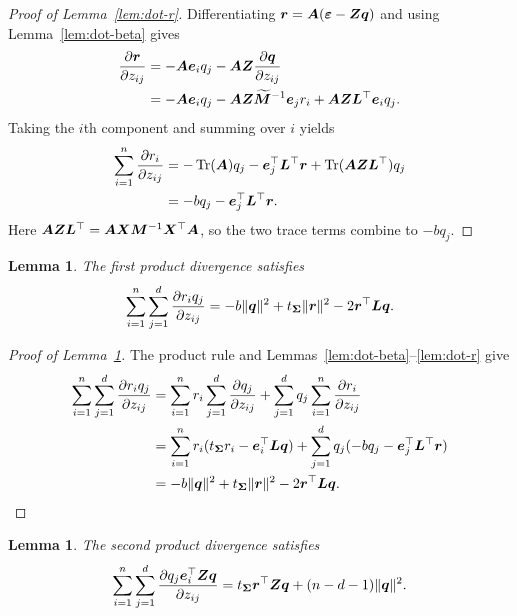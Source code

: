 \documentclass{article}
\theoremstyle{plain} %
\newtheorem{lemma}[theorem]{Lemma}
\theoremstyle{definition} %
\theoremstyle{definition} %
\begin{document}
\begin{proof}[Proof of Lemma~\ref{lem:dot-r}]
Differentiating $\boldsymbol{r}=\boldsymbol{A}({\boldsymbol{\varepsilon} }-\boldsymbol{Z}\boldsymbol{q})$ and using
Lemma~\ref{lem:dot-beta} gives
\begin{align*}
    \pdv{\boldsymbol{r}}{z_{ij}}
    &=-\boldsymbol{A}\boldsymbol{e}_iq_j-\boldsymbol{A}\boldsymbol{Z}\pdv{\boldsymbol{q}}{z_{ij}}\\
    &=-\boldsymbol{A}\boldsymbol{e}_iq_j
       -\boldsymbol{A}\boldsymbol{Z}\widetilde{\boldsymbol{M}}^{-1}\boldsymbol{e}_jr_i
       +\boldsymbol{A}\boldsymbol{Z}\boldsymbol{L}^\top\boldsymbol{e}_iq_j.
\end{align*}
Taking the $i$th component and summing over $i$ yields
\begin{align*}
    \sum_{i=1}^n\pdv{r_i}{z_{ij}}
    &=-\operatorname{Tr}(\boldsymbol{A})q_j-\boldsymbol{e}_j^\top\boldsymbol{L}^\top\boldsymbol{r}
       +\operatorname{Tr}(\boldsymbol{A}\boldsymbol{Z}\boldsymbol{L}^\top)q_j\\
    &=-bq_j-\boldsymbol{e}_j^\top\boldsymbol{L}^\top\boldsymbol{r}.
\end{align*}
Here
$\boldsymbol{A}\boldsymbol{Z}\boldsymbol{L}^\top=\boldsymbol{A}\boldsymbol{X}\boldsymbol{M}^{-1}\boldsymbol{X}^\top\boldsymbol{A}$,
so the two trace terms combine to $-bq_j$.
\end{proof}

\begin{lemma}\label{lem:dot-rh}
The first product divergence satisfies
\begin{align*}
    \sum_{i=1}^n\sum_{j=1}^d\pdv{r_iq_j}{z_{ij}}
    =-b\lVert\boldsymbol{q}\rVert^2+t_{\boldsymbol{\Sigma}}\lVert\boldsymbol{r}\rVert^2
      -2\boldsymbol{r}^\top\boldsymbol{L}\boldsymbol{q}.
\end{align*}
\end{lemma}

\begin{proof}[Proof of Lemma~\ref{lem:dot-rh}]
The product rule and Lemmas~\ref{lem:dot-beta}--\ref{lem:dot-r} give
\begin{align*}
    \sum_{i=1}^n\sum_{j=1}^d\pdv{r_iq_j}{z_{ij}}
    &=\sum_{i=1}^n r_i\sum_{j=1}^d\pdv{q_j}{z_{ij}}
       +\sum_{j=1}^d q_j\sum_{i=1}^n\pdv{r_i}{z_{ij}}\\
    &=\sum_{i=1}^n r_i(t_{\boldsymbol{\Sigma}}r_i-\boldsymbol{e}_i^\top\boldsymbol{L}\boldsymbol{q})
       +\sum_{j=1}^d q_j(-bq_j-\boldsymbol{e}_j^\top\boldsymbol{L}^\top\boldsymbol{r})\\
    &=-b\lVert\boldsymbol{q}\rVert^2+t_{\boldsymbol{\Sigma}}\lVert\boldsymbol{r}\rVert^2
       -2\boldsymbol{r}^\top\boldsymbol{L}\boldsymbol{q}.
\end{align*}
\end{proof}

\begin{lemma}\label{lem:dot-hxh}
The second product divergence satisfies
\begin{align*}
    \sum_{i=1}^n\sum_{j=1}^d
       \pdv{q_j\boldsymbol{e}_i^\top\boldsymbol{Z}\boldsymbol{q}}{z_{ij}}
    =t_{\boldsymbol{\Sigma}}\boldsymbol{r}^\top\boldsymbol{Z}\boldsymbol{q}+(n-d-1)\lVert\boldsymbol{q}\rVert^2.
\end{align*}
\end{lemma}
\end{document}
